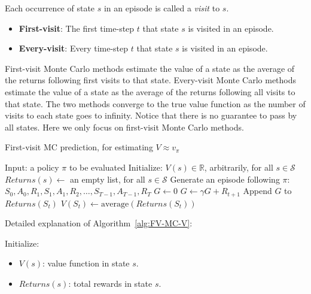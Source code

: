 \documentclass{article}
\begin{document}
Each occurrence of state $s$ in an episode is called a \emph{visit} to $s$.
\begin{itemize}
    \item \textbf{First-visit}: The first time-step $t$ that state $s$ is visited in an episode.
    \item \textbf{Every-visit}: Every time-step $t$ that state $s$ is visited in an episode.
\end{itemize}

First-visit Monte Carlo methods estimate the value of a state as the average of the returns following first visits to that state. Every-visit Monte Carlo methods estimate the value of a state as the average of the returns following all visits to that state. The two methods converge to the true value function as the number of visits to each state goes to infinity. Notice that there is no guarantee to pass by all states. Here we only focus on first-visit Monte Carlo methods.

\begin{algorithm}
    \caption{First-visit MC prediction, for estimating $V \approx v_\pi$}\label{alg:FV-MC-V}
    \begin{algorithmic}
        \State Input: a policy $\pi$ to be evaluated
        \State Initialize:
        \State \hspace{\algorithmicindent} $V(s) \in \mathbb{R}$, arbitrarily, for all $s \in \mathcal{S}$
        \State \hspace{\algorithmicindent} $Returns(s) \leftarrow$ an empty list, for all $s \in \mathcal{S}$
        \State Generate an episode following $\pi$: $S_0, A_0, R_1, S_1, A_1, R_2, \dots, S_{T-1}, A_{T-1}, R_T$
        \State $G \leftarrow 0$
        \State $G \leftarrow \gamma G + R_{t+1}$
        \State Append $G$ to $Returns(S_t)$
        \State $V(S_t) \leftarrow \text{average}(Returns(S_t))$
        \EndIf
        \EndFor
        \EndLoop
    \end{algorithmic}
\end{algorithm}

Detailed explanation of Algorithm~\ref{alg:FV-MC-V}:

Initialize:
\begin{itemize}
    \item $V(s)$: value function in state $s$.
    \item $Returns(s)$: total rewards in state $s$.
\end{itemize}
\end{document}
